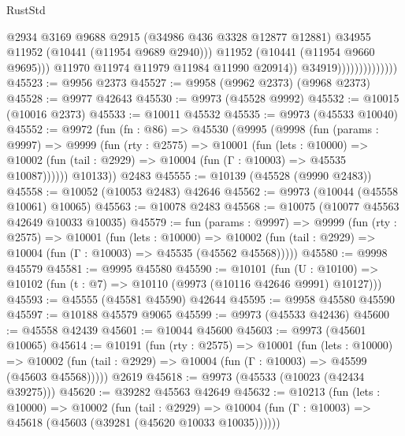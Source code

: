 \begin{lexlean}{RustStd}
\begin{coremodule}
                                        @2934
                                        @3169
                                        @9688
                                        @2915
                                        (@34986 @436 @3328 @12877 @12881)
                                        @34955
                                        @11952
                                        (@10441 (@11954 @9689 @2940)))
                                      @11952
                                      (@10441 (@11954 @9660 @9695)))
                                    @11970
                                    @11974
                                    @11979
                                    @11984
                                    @11990
                                    @20914))
                                @34919))))))))))))))
@45523 := @9956 @2373
@45527 := @9958 (@9962 @2373) (@9968 @2373)
@45528 := @9977 @42643
@45530 := @9973 (@45528 @9992)
@45532 := @10015 (@10016 @2373)
@45533 := @10011 @45532
@45535 := @9973 (@45533 @10040)
@45552 := @9972
    (fun (fn : @86) =>
    @45530
      (@9995
        (@9998
          (fun (params : @9997) =>
          @9999
            (fun (rty : @2575) =>
            @10001
              (fun (lets : @10000) =>
              @10002 (fun (tail : @2929) => @10004 (fun (Γ : @10003) => @45535 @10087))))))
        @10133))
    @2483
@45555 := @10139 (@45528 (@9990 @2483))
@45558 := @10052 (@10053 @2483) @42646
@45562 := @9973 (@10044 (@45558 @10061) @10065)
@45563 := @10078 @2483
@45568 := @10075 (@10077 @45563 @42649 @10033 @10035)
@45579 := fun (params : @9997) =>
  @9999
    (fun (rty : @2575) =>
    @10001
      (fun (lets : @10000) =>
      @10002 (fun (tail : @2929) => @10004 (fun (Γ : @10003) => @45535 (@45562 @45568)))))
@45580 := @9998 @45579
@45581 := @9995 @45580
@45590 := @10101
    (fun (U : @10100) => @10102 (fun (t : @7) => @10110 (@9973 (@10116 @42646 @9991) @10127)))
@45593 := @45555 (@45581 @45590) @42644
@45595 := @9958 @45580 @45590
@45597 := @10188 @45579 @9065
@45599 := @9973 (@45533 @42436)
@45600 := @45558 @42439
@45601 := @10044 @45600
@45603 := @9973 (@45601 @10065)
@45614 := @10191
    (fun (rty : @2575) =>
    @10001
      (fun (lets : @10000) =>
      @10002 (fun (tail : @2929) => @10004 (fun (Γ : @10003) => @45599 (@45603 @45568)))))
    @2619
@45618 := @9973 (@45533 (@10023 (@42434 @39275)))
@45620 := @39282 @45563 @42649
@45632 := @10213
    (fun (lets : @10000) =>
    @10002
      (fun (tail : @2929) =>
      @10004 (fun (Γ : @10003) => @45618 (@45603 (@39281 (@45620 @10033 @10035))))))

\end{coremodule}
\end{lexlean}
